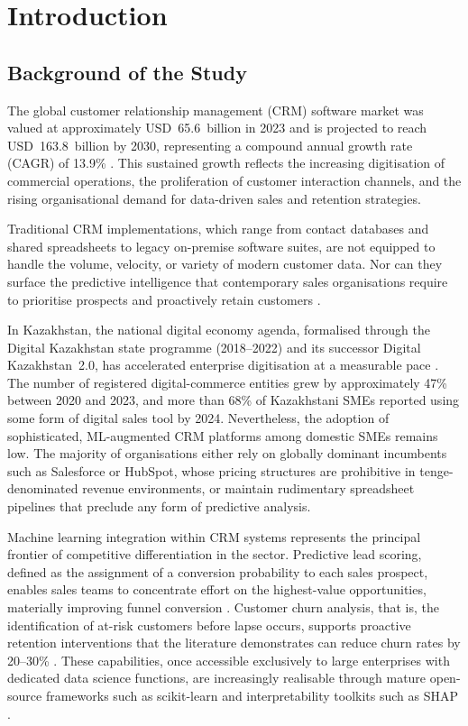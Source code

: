\chapter{Introduction}
\label{chap:intro}
%
\section{Background of the Study}

The global customer relationship management (CRM) software market was
valued at approximately USD~65.6~billion in 2023 and is projected to
reach USD~163.8~billion by 2030, representing a compound annual growth
rate (CAGR) of 13.9\% \citep{grandview2023}. This sustained growth
reflects the increasing digitisation of commercial operations, the
proliferation of customer interaction channels, and the rising
organisational demand for data-driven sales and retention strategies.

Traditional CRM implementations, which range from contact databases and
shared spreadsheets to legacy on-premise software suites, are not
equipped to handle the volume, velocity, or variety of modern customer
data. Nor can they surface the predictive intelligence that contemporary
sales organisations require to prioritise prospects and proactively retain
customers \citep{buttle2019}.

In Kazakhstan, the national digital economy agenda, formalised through the
Digital Kazakhstan state programme (2018--2022) and its successor Digital
Kazakhstan~2.0, has accelerated enterprise digitisation at a measurable
pace \citep{kazakhstan2024digital}. The number of registered
digital-commerce entities grew by approximately 47\% between 2020 and
2023, and more than 68\% of Kazakhstani SMEs reported using some form of
digital sales tool by 2024. Nevertheless, the adoption of sophisticated,
ML-augmented CRM platforms among domestic SMEs remains low. The majority
of organisations either rely on globally dominant incumbents such as
Salesforce or HubSpot, whose pricing structures are prohibitive in
tenge-denominated revenue environments, or maintain rudimentary spreadsheet
pipelines that preclude any form of predictive analysis.

Machine learning integration within CRM systems represents the principal
frontier of competitive differentiation in the sector. Predictive lead
scoring, defined as the assignment of a conversion probability to each
sales prospect, enables sales teams to concentrate effort on the
highest-value opportunities, materially improving funnel conversion
\citep{verbeke2012}. Customer churn analysis, that is, the identification
of at-risk customers before lapse occurs, supports proactive retention
interventions that the literature demonstrates can reduce churn rates by
20--30\% \citep{verbeke2012}. These capabilities, once accessible
exclusively to large enterprises with dedicated data science functions, are
increasingly realisable through mature open-source frameworks such as
scikit-learn \citep{chen2016xgboost} and interpretability toolkits such as
SHAP \citep{lundberg2017shap}.

